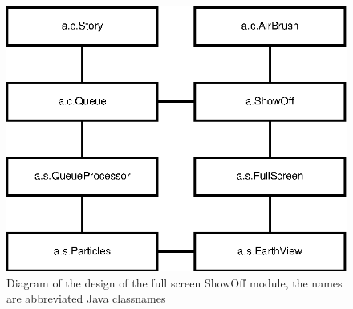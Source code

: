 \begin{classinterface}
\end{classinterface}



\begin{figure}
  \centering
  \includegraphics{image/showoff-fullscreen}
  \caption{
    Diagram of the design of the full screen ShowOff module, the names are
    abbreviated Java classnames
  }
\end{figure}


